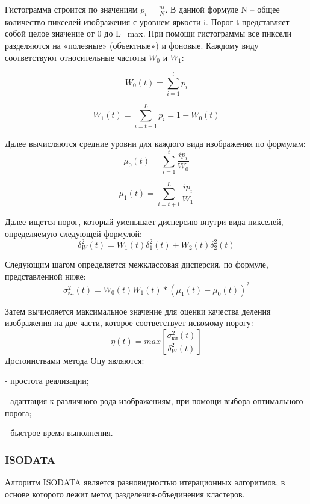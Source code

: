 \documentclass[a4paper,12pt]{article}
\begin{document}
Гистограмма строится по значениям $p_i = \frac{ni}{N}$. В данной формуле N – общее количество пикселей изображения с уровнем яркости i. Порог t представляет собой целое значение от 0 до L=max. При помощи гистограммы все пиксели разделяются на «полезные» (объектные») и фоновые. Каждому виду соответствуют относительные частоты $W_0$ и $W_1$:

\begin{equation}
    W_0(t) = \sum_{i=1}^t p_i
\end{equation}

\begin{equation}
    W_1(t) = \sum_{i=t+1}^L p_i = 1 - W_0(t)
\end{equation}

Далее вычисляются средние уровни для каждого вида изображения по формулам:
\begin{equation}
    \mu_0(t) = \sum_{i=1}^t \frac{i p_i}{W_0}
\end{equation}

\begin{equation}
    \mu_1(t) = \sum_{i=t+1}^L \frac{i p_i}{W_1}
\end{equation}

Далее ищется порог, который уменьшает дисперсию внутри вида пикселей, определяемую
следующей формулой:
\begin{equation}
    \delta_W^2(t) = W_1(t)\delta_1^2(t) + W_2(t)\delta_2^2(t)
\end{equation}

Следующим шагом определяется межклассовая дисперсия, по формуле, представленной
ниже:
\begin{equation}
    \sigma_{\text{кл}}^2(t) = W_0(t)W_1(t) * (\mu_1(t) - \mu_0(t))^2
\end{equation}

Затем вычисляется максимальное значение для оценки качества деления изображения на
две части, которое соответствует искомому порогу:
\begin{equation}
    \eta(t) = max \left[\frac{\sigma_{\text{кл}}^2(t)}{\delta_W^2(t)}\right]
\end{equation}
Достоинствами метода Оцу являются:

- простота реализации;

- адаптация к различного рода изображениям, при помощи выбора оптимального порога;

- быстрое время выполнения.

\subsubsection*{ISODATA}
Алгоритм ISODATA является разновидностью итерационных
алгоритмов, в основе которого лежит метод разделения-объединения
кластеров.
\end{document}
